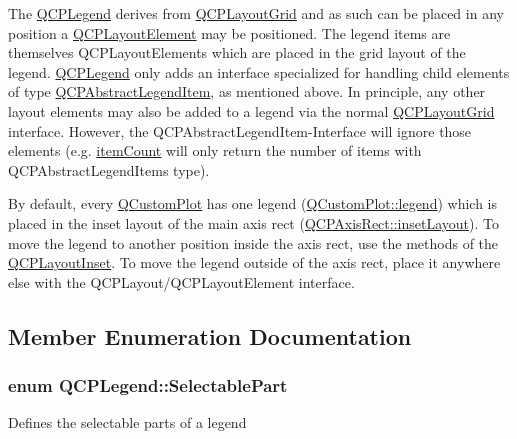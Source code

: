 The \hyperlink{classQCPLegend}{Q\+C\+P\+Legend} derives from \hyperlink{classQCPLayoutGrid}{Q\+C\+P\+Layout\+Grid} and as such can be placed in any position a \hyperlink{classQCPLayoutElement}{Q\+C\+P\+Layout\+Element} may be positioned. The legend items are themselves Q\+C\+P\+Layout\+Elements which are placed in the grid layout of the legend. \hyperlink{classQCPLegend}{Q\+C\+P\+Legend} only adds an interface specialized for handling child elements of type \hyperlink{classQCPAbstractLegendItem}{Q\+C\+P\+Abstract\+Legend\+Item}, as mentioned above. In principle, any other layout elements may also be added to a legend via the normal \hyperlink{classQCPLayoutGrid}{Q\+C\+P\+Layout\+Grid} interface. However, the Q\+C\+P\+Abstract\+Legend\+Item-\/\+Interface will ignore those elements (e.\+g. \hyperlink{classQCPLegend_a198228e9cdc78d3a3c306fa6763d0404}{item\+Count} will only return the number of items with Q\+C\+P\+Abstract\+Legend\+Items type).

By default, every \hyperlink{classQCustomPlot}{Q\+Custom\+Plot} has one legend (\hyperlink{classQCustomPlot_a4eadcd237dc6a09938b68b16877fa6af}{Q\+Custom\+Plot\+::legend}) which is placed in the inset layout of the main axis rect (\hyperlink{classQCPAxisRect_a4114887c7141b59650b7488f930993e5}{Q\+C\+P\+Axis\+Rect\+::inset\+Layout}). To move the legend to another position inside the axis rect, use the methods of the \hyperlink{classQCPLayoutInset}{Q\+C\+P\+Layout\+Inset}. To move the legend outside of the axis rect, place it anywhere else with the Q\+C\+P\+Layout/\+Q\+C\+P\+Layout\+Element interface. 

\subsection{Member Enumeration Documentation}
\hypertarget{classQCPLegend_a5404de8bc1e4a994ca4ae69e2c7072f1}{}
\subsubsection[{Selectable\+Part}]{\setlength{\rightskip}{0pt plus 5cm}enum {\bf Q\+C\+P\+Legend\+::\+Selectable\+Part}}\label{classQCPLegend_a5404de8bc1e4a994ca4ae69e2c7072f1}
Defines the selectable parts of a legend

